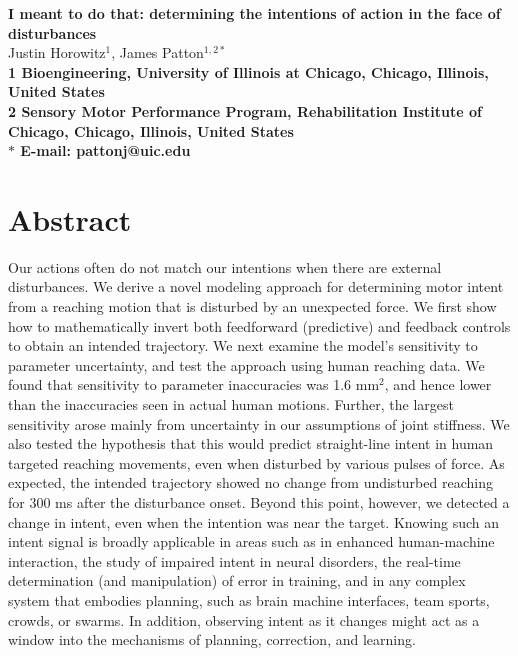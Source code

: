 \pagestyle{myheadings}

\usepackage[section]{placeins}







\begin{flushleft}
{\Large
\textbf{I meant to do that: determining the intentions of action in the face of disturbances}
}
\\
Justin Horowitz$^{1}$, 
James Patton$^{1,2\ast}$
\\
\bf{1} Bioengineering, University of Illinois at Chicago, Chicago, Illinois, United States
\\
\bf{2} Sensory Motor Performance Program, Rehabilitation Institute of Chicago, Chicago, Illinois, United States
\\
$\ast$ E-mail: pattonj@uic.edu
\end{flushleft}

\section*{Abstract}
Our actions often do not match our intentions when there are external disturbances. We derive a novel modeling approach for determining motor intent from a reaching motion that is disturbed by an unexpected force. We first show how to mathematically invert both feedforward (predictive) and feedback controls to obtain an intended trajectory. We next examine the model’s sensitivity to parameter uncertainty, and test the approach using human reaching data. We found that sensitivity to parameter inaccuracies was 1.6 $\mathrm{mm}^2$, and hence lower than the inaccuracies seen in actual human motions. Further, the largest sensitivity arose mainly from uncertainty in our assumptions of joint stiffness. We also tested the hypothesis that this would predict straight-line intent in human targeted reaching movements, even when disturbed by various pulses of force. As expected, the intended trajectory showed no change from undisturbed reaching for 300 ms after the disturbance onset. Beyond this point, however, we detected a change in intent, even when the intention was near the target.  Knowing such an intent signal is broadly applicable in areas such as in enhanced human-machine interaction, the study of impaired intent in neural disorders, the real-time determination (and manipulation) of error in training, and in any complex system that embodies planning, such as brain machine interfaces, team sports, crowds, or swarms. In addition, observing intent as it changes might act as a window into the mechanisms of planning, correction, and learning.

